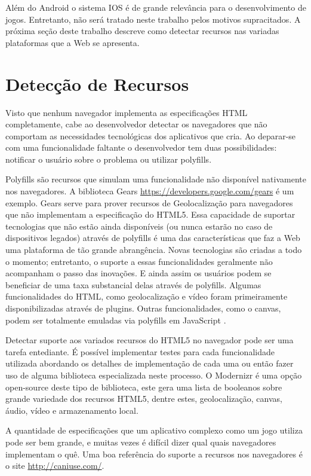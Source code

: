 Além do Android o sistema IOS é de grande relevância
para o desenvolvimento de jogos. Entretanto, não será tratado neste
trabalho pelos motivos supracitados. A próxima seção deste trabalho
descreve como detectar recursos nas variadas plataformas que a Web se
apresenta.

\section{Detecção de Recursos}
Visto que nenhum navegador implementa as especificações HTML
completamente, cabe ao desenvolvedor detectar os navegadores que não
comportam as necessidades tecnológicas dos aplicativos que cria. Ao
deparar-se com uma funcionalidade faltante o desenvolvedor tem duas
possibilidades: notificar o usuário sobre o problema ou utilizar
polyfills.

Polyfills são recursos que simulam uma funcionalidade não
disponível nativamente nos navegadores. A biblioteca Gears
\url{https://developers.google.com/gears} é um exemplo. Gears
serve para prover recursos de Geolocalização para navegadores que
não implementam a especificação do HTML5. Essa capacidade de
suportar tecnologias que não estão ainda disponíveis (ou nunca
estarão no caso de dispositivos legados) através de polyfills é
uma das características que faz a Web uma plataforma de tão grande
abrangência. Novas tecnologias são criadas a todo o momento;
entretanto, o suporte a essas funcionalidades geralmente não
acompanham o passo das inovações. E ainda assim os usuários podem
se beneficiar de uma taxa substancial delas através de polyfills.
Algumas funcionalidades do HTML, como geolocalização e vídeo
foram primeiramente disponibilizadas através de plugins. Outras
funcionalidades, como o canvas, podem ser totalmente emuladas via
polyfills em JavaScript \autocite{diveIntohtml}.

Detectar suporte aos variados recursos do HTML5 no navegador
pode ser uma tarefa entediante. É possível implementar testes para
cada funcionalidade utilizada abordando os detalhes de implementação
de cada uma ou então fazer uso de alguma biblioteca especializada
neste processo. O Modernizr é uma opção open-source deste tipo de
biblioteca, este gera uma lista de booleanos sobre grande variedade dos
recursos HTML5, dentre estes, geolocalização, canvas, áudio, vídeo e
armazenamento local.

A quantidade de especificações que um aplicativo complexo como um jogo
utiliza pode ser bem grande, e muitas vezes é difícil dizer qual quais
navegadores implementam o quê. Uma boa referência do suporte a recursos
nos navegadores é o site \url{http://caniuse.com/}.

